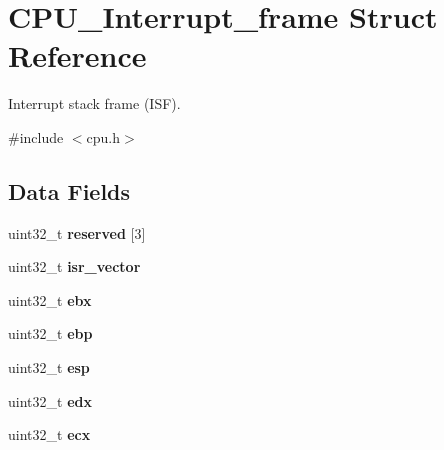 \hypertarget{structCPU__Interrupt__frame}{}\section{C\+P\+U\+\_\+\+Interrupt\+\_\+frame Struct Reference}
\label{structCPU__Interrupt__frame}


Interrupt stack frame (I\+SF).  




{\ttfamily \#include $<$cpu.\+h$>$}

\subsection*{Data Fields}
\begin{DoxyCompactItemize}
\item 
\mbox{\label{structCPU__Interrupt__frame_ae4d2c7b26f7bc97177e837fe5e7f11f5}} 
uint32\+\_\+t {\bfseries reserved} \mbox{[}3\mbox{]}
\item 
\mbox{\label{structCPU__Interrupt__frame_a2d8107c33451667f1805a1bbf0b2d71a}} 
uint32\+\_\+t {\bfseries isr\+\_\+vector}
\item 
\mbox{\label{structCPU__Interrupt__frame_a17618bc72b78b802ab0bf5890e88322f}} 
uint32\+\_\+t {\bfseries ebx}
\item 
\mbox{\label{structCPU__Interrupt__frame_a75c00d66495f0fda2777e9efac0c6be8}} 
uint32\+\_\+t {\bfseries ebp}
\item 
\mbox{\label{structCPU__Interrupt__frame_a9e7805263d9c48cee07a73cb0cd3deed}} 
uint32\+\_\+t {\bfseries esp}
\item 
\mbox{\label{structCPU__Interrupt__frame_aea91c9afc084f426fe58a82564ebf0db}} 
uint32\+\_\+t {\bfseries edx}
\item 
\mbox{\label{structCPU__Interrupt__frame_a7110591852cf9f8176739fd5f05f337f}} 
uint32\+\_\+t {\bfseries ecx}
\item 
\mbox{\label{structCPU__Interrupt__frame_ae35ec315695316fa2435761e24df71e8}} 

\end{DoxyCompactItemize}
